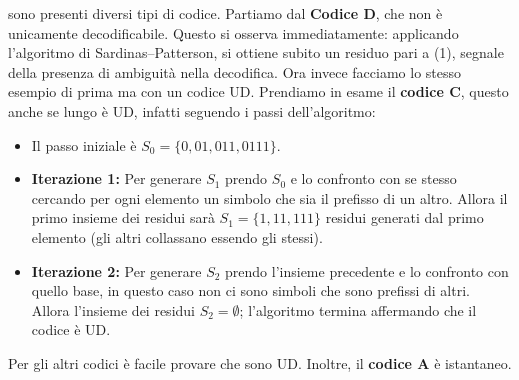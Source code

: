 \documentclass{article}
\theoremstyle{definition}
\numberwithin{equation}{section}
\begin{document}
sono presenti diversi tipi di codice. Partiamo dal \textbf{Codice D}, che non è unicamente decodificabile. Questo si osserva immediatamente: applicando l’algoritmo di Sardinas–Patterson, si ottiene subito un residuo pari a (1), segnale della presenza di ambiguità nella decodifica. Ora invece facciamo lo stesso esempio di prima ma con un codice UD. Prendiamo in esame il \textbf{codice C}, questo anche se lungo è UD, infatti seguendo i passi dell'algoritmo:
\begin{itemize}
    \item Il passo iniziale è $S_0=\{0,01,011,0111\}$.
    \item \textbf{Iterazione 1:} Per generare $S_1$ prendo $S_0$ e lo confronto con se stesso cercando per ogni elemento un simbolo che sia il prefisso di un altro. Allora il primo insieme dei residui sarà $S_1=\{1,11,111\}$ residui generati dal primo elemento (gli altri collassano essendo gli stessi).
    \item \textbf{Iterazione 2:} Per generare $S_2$ prendo l'insieme precedente e lo confronto con quello base, in questo caso non ci sono simboli che sono prefissi di altri. Allora l'insieme dei residui $S_2=\emptyset$; l'algoritmo termina affermando che il codice è UD.
\end{itemize}
Per gli altri codici è facile provare che sono UD. Inoltre, il \textbf{codice A} è istantaneo.
\end{document}
